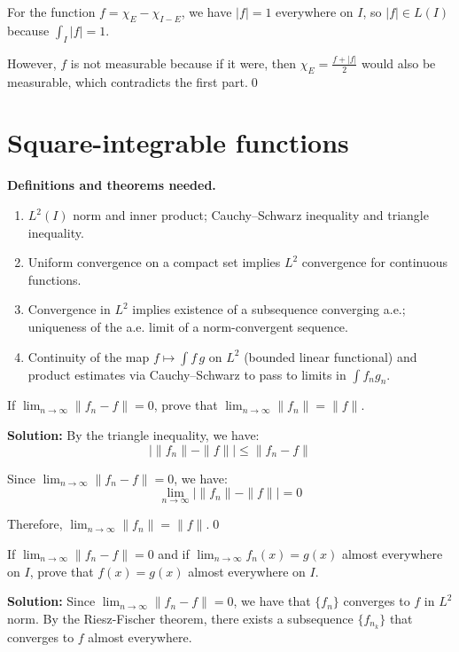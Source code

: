 For the function $f = \chi_E - \chi_{I-E}$, we have $|f| = 1$ everywhere on $I$, so $|f| \in L(I)$ because $\int_I |f| = 1$.

However, $f$ is not measurable because if it were, then $\chi_E = \frac{f + |f|}{2}$ would also be measurable, which contradicts the first part.\qed
\section{Square-integrable functions}

\noindent\textbf{Definitions and theorems needed.}
\begin{enumerate}[label=(\alph*)]
    \item $L^2(I)$ norm and inner product; Cauchy–Schwarz inequality and triangle inequality.
    \item Uniform convergence on a compact set implies $L^2$ convergence for continuous functions.
    \item Convergence in $L^2$ implies existence of a subsequence converging a.e.; uniqueness of the a.e. limit of a norm-convergent sequence.
    \item Continuity of the map $f\mapsto \int f\,g$ on $L^2$ (bounded linear functional) and product estimates via Cauchy–Schwarz to pass to limits in $\int f_ng_n$.
\end{enumerate}



\begin{problembox}
If $\lim_{n \to \infty} \| f_n - f \| = 0$, prove that $\lim_{n \to \infty} \| f_n \| = \| f \|$.
\end{problembox}

\bigskip\noindent\textbf{Solution:}
By the triangle inequality, we have:
\[|\| f_n \| - \| f \|| \leq \| f_n - f \|\]

Since $\lim_{n \to \infty} \| f_n - f \| = 0$, we have:
\[\lim_{n \to \infty} |\| f_n \| - \| f \|| = 0\]

Therefore, $\lim_{n \to \infty} \| f_n \| = \| f \|$.\qed


\begin{problembox}
If $\lim_{n \to \infty} \| f_n - f \| = 0$ and if $\lim_{n \to \infty} f_n(x) = g(x)$ almost everywhere on $I$, prove that $f(x) = g(x)$ almost everywhere on $I$.
\end{problembox}

\bigskip\noindent\textbf{Solution:}
Since $\lim_{n \to \infty} \| f_n - f \| = 0$, we have that $\{f_n\}$ converges to $f$ in $L^2$ norm. By the Riesz-Fischer theorem, there exists a subsequence $\{f_{n_k}\}$ that converges to $f$ almost everywhere.


